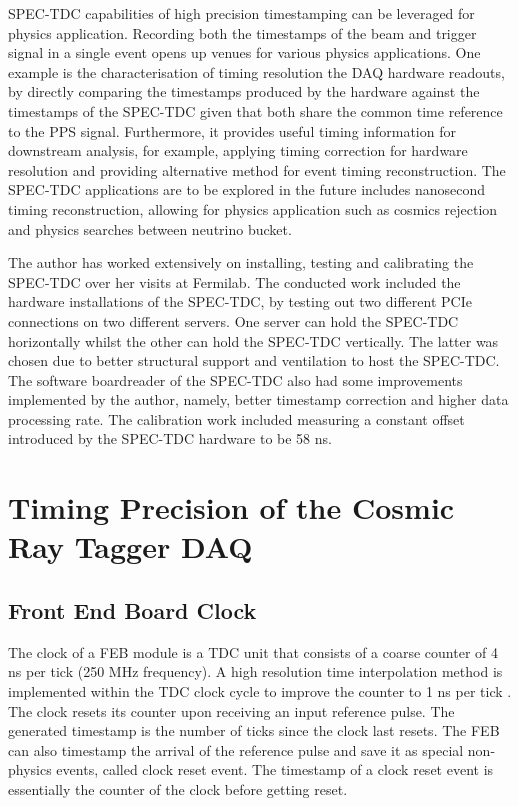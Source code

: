 SPEC-TDC capabilities of high precision timestamping can be leveraged for physics application.
Recording both the timestamps of the beam and trigger signal in a single event opens up venues for various physics applications. 
One example is the characterisation of timing resolution the DAQ hardware readouts, by directly comparing the timestamps produced by the hardware against the timestamps of the SPEC-TDC given that both share the common time reference to the PPS signal.
Furthermore, it provides useful timing information for downstream analysis, for example, applying timing correction for hardware resolution and providing alternative method for event timing reconstruction. 
The SPEC-TDC applications are to be explored in the future includes nanosecond timing reconstruction, allowing for physics application such as cosmics rejection and physics searches between neutrino bucket.

The author has worked extensively on installing, testing and calibrating the SPEC-TDC over her visits at Fermilab.
The  conducted work included the hardware installations of the SPEC-TDC, by testing out two different PCIe connections on two different servers. 
One server can hold the SPEC-TDC horizontally whilst the other can hold the SPEC-TDC vertically. 
The latter was chosen due to better structural support and ventilation to host the SPEC-TDC.
The software boardreader of the SPEC-TDC also had some improvements implemented by the author, namely, better timestamp correction and higher data processing rate.
The calibration work included measuring a constant offset introduced by the SPEC-TDC hardware to be 58 ns.

\section{Timing Precision of the Cosmic Ray Tagger DAQ}
\label{sec4InternalClock}


\subsection{Front End Board Clock}

The clock of a FEB module is a TDC unit that consists of a coarse counter of 4 ns per tick (250 MHz frequency). 
A high resolution time interpolation method is implemented within the TDC clock cycle to improve the counter to 1 ns per tick \cite{crt_clock}.
The clock resets its counter upon receiving an input reference pulse.  
The generated timestamp is the number of ticks since the clock last resets.
The FEB can also timestamp the arrival of the reference pulse and save it as special non-physics events, called clock reset event.
The timestamp of a clock reset event is essentially the counter of the clock before getting reset.

